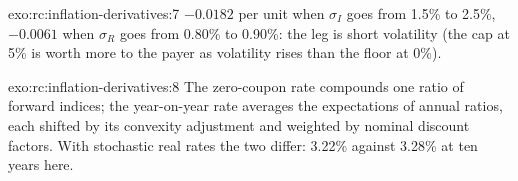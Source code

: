 \begin{solution}{exo:rc:inflation-derivatives:7}
$-0.0182$ per unit when $\sigma_I$ goes from 1.5\% to 2.5\%, $-0.0061$ when $\sigma_R$ goes from 0.80\%
to 0.90\%: the leg is short volatility (the cap at 5\% is worth more to the payer as volatility
rises than the floor at 0\%).
\end{solution}

\begin{solution}{exo:rc:inflation-derivatives:8}
The zero-coupon rate compounds one ratio of forward indices; the year-on-year rate averages
the expectations of annual ratios, each shifted by its convexity adjustment and weighted by
nominal discount factors. With stochastic real rates the two differ: 3.22\% against 3.28\% at
ten years here.
\end{solution}

